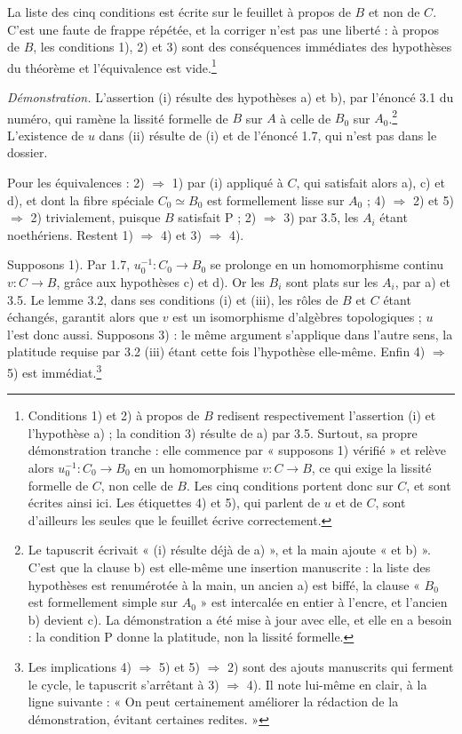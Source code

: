 \documentclass[11pt,a4paper]{article}
\begin{document}
La liste des cinq conditions est écrite sur le feuillet à propos de $B$ et non
de $C$. C'est une faute de frappe répétée, et la corriger n'est pas une
liberté : à propos de $B$, les conditions 1), 2) et 3) sont des conséquences
immédiates des hypothèses du théorème et l'équivalence est
vide.\footnote{Conditions 1) et 2) à propos de $B$ redisent respectivement
l'assertion (i) et l'hypothèse a) ; la condition 3) résulte de a) par 3.5.
Surtout, sa propre démonstration tranche : elle commence par « supposons 1)
vérifié » et relève alors $u_0^{-1} : C_0 \to B_0$ en un homomorphisme
$v : C \to B$, ce qui exige la lissité formelle de \emph{$C$}, non celle de
$B$. Les cinq conditions portent donc sur $C$, et sont écrites ainsi ici. Les
étiquettes 4) et 5), qui parlent de $u$ et de $C$, sont d'ailleurs les seules
que le feuillet écrive correctement.}

\emph{Démonstration.} L'assertion (i) résulte des hypothèses a) et b), par
l'énoncé 3.1 du numéro, qui ramène la lissité formelle de $B$ sur $A$ à celle
de $B_0$ sur $A_0$.\footnote{Le tapuscrit écrivait « (i) résulte déjà de a) »,
et la main ajoute « et b) ». C'est que la clause b) est elle-même une insertion
manuscrite : la liste des hypothèses est renumérotée à la main, un ancien a)
est biffé, la clause « $B_0$ est formellement simple sur $A_0$ » est intercalée
en entier à l'encre, et l'ancien b) devient c). La démonstration a été mise à
jour avec elle, et elle en a besoin : la condition P donne la platitude, non la
lissité formelle.} L'existence de $u$ dans (ii) résulte de (i) et de
l'énoncé 1.7, qui n'est pas dans le dossier.

Pour les équivalences : 2) $\Rightarrow$ 1) par (i) appliqué à $C$, qui
satisfait alors a), c) et d), et dont la fibre spéciale $C_0 \simeq B_0$ est
formellement lisse sur $A_0$ ; 4) $\Rightarrow$ 2) et 5) $\Rightarrow$ 2)
trivialement, puisque $B$ satisfait P ; 2) $\Rightarrow$ 3) par 3.5, les $A_i$
étant noethériens. Restent 1) $\Rightarrow$ 4) et 3) $\Rightarrow$ 4).

Supposons 1). Par 1.7, $u_0^{-1} : C_0 \to B_0$ se prolonge en un homomorphisme
continu $v : C \to B$, grâce aux hypothèses c) et d). Or les $B_i$ sont plats
sur les $A_i$, par a) et 3.5. Le lemme 3.2, dans ses conditions (i) et (iii),
les rôles de $B$ et $C$ étant échangés, garantit alors que $v$ est un
isomorphisme d'algèbres topologiques ; $u$ l'est donc aussi. Supposons 3) :
le même argument s'applique dans l'autre sens, la platitude requise par 3.2
(iii) étant cette fois l'hypothèse elle-même. Enfin 4) $\Rightarrow$ 5) est
immédiat.\footnote{Les implications 4) $\Rightarrow$ 5) et 5) $\Rightarrow$ 2)
sont des ajouts manuscrits qui ferment le cycle, le tapuscrit s'arrêtant à
3) $\Rightarrow$ 4). Il note lui-même en clair, à la ligne suivante : « On peut
certainement améliorer la rédaction de la démonstration, évitant certaines
redites. »}
\end{document}
